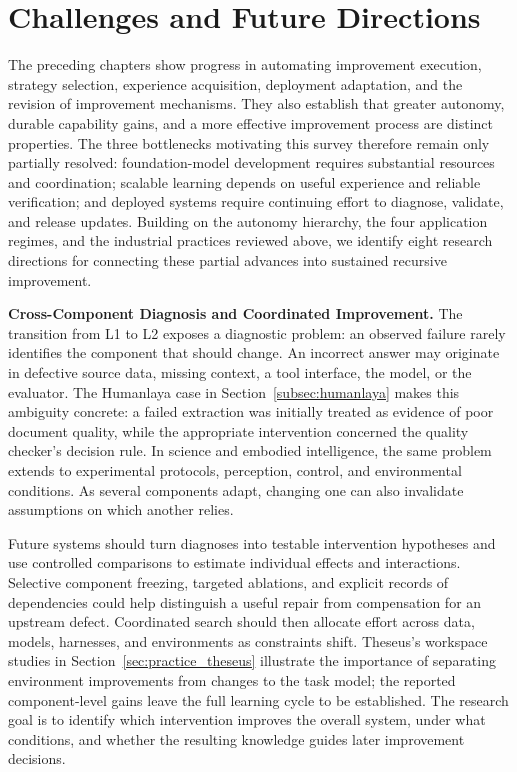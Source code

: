 

\section{Challenges and Future Directions}

The preceding chapters show progress in automating improvement execution, strategy selection, experience acquisition, deployment adaptation, and the revision of improvement mechanisms. They also establish that greater autonomy, durable capability gains, and a more effective improvement process are distinct properties. The three bottlenecks motivating this survey therefore remain only partially resolved: foundation-model development requires substantial resources and coordination; scalable learning depends on useful experience and reliable verification; and deployed systems require continuing effort to diagnose, validate, and release updates. Building on the autonomy hierarchy, the four application regimes, and the industrial practices reviewed above, we identify eight research directions for connecting these partial advances into sustained recursive improvement.

\noindent\textbf{Cross-Component Diagnosis and Coordinated Improvement.}
The transition from L1 to L2 exposes a diagnostic problem: an observed failure rarely identifies the component that should change. An incorrect answer may originate in defective source data, missing context, a tool interface, the model, or the evaluator. The Humanlaya case in Section~\ref{subsec:humanlaya} makes this ambiguity concrete: a failed extraction was initially treated as evidence of poor document quality, while the appropriate intervention concerned the quality checker's decision rule. In science and embodied intelligence, the same problem extends to experimental protocols, perception, control, and environmental conditions. As several components adapt, changing one can also invalidate assumptions on which another relies.

Future systems should turn diagnoses into testable intervention hypotheses and use controlled comparisons to estimate individual effects and interactions. Selective component freezing, targeted ablations, and explicit records of dependencies could help distinguish a useful repair from compensation for an upstream defect. Coordinated search should then allocate effort across data, models, harnesses, and environments as constraints shift. Theseus's workspace studies in Section~\ref{sec:practice_theseus} illustrate the importance of separating environment improvements from changes to the task model; the reported component-level gains leave the full learning cycle to be established. The research goal is to identify which intervention improves the overall system, under what conditions, and whether the resulting knowledge guides later improvement decisions.

